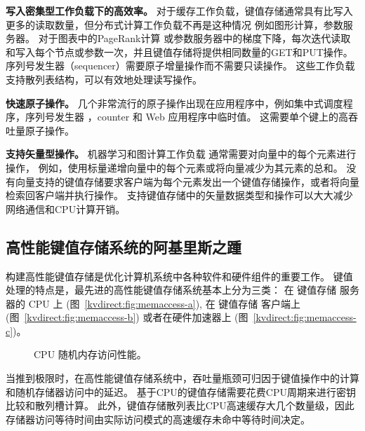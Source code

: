 \textbf {写入密集型工作负载下的高效率。}
对于缓存工作负载，键值存储通常具有比写入更多的读取数量\cite {atikoglu2012workload}，但分布式计算工作负载不再是这种情况
例如图形计算\cite {page1999pagerank}，参数服务器\cite {li2014scaling}。
对于图表中的PageRank计算\cite {page1999pagerank} 或参数服务器中的梯度下降\cite {li2014scaling}，每次迭代读取和写入每个节点或参数一次，并且键值存储将提供相同数量的GET和PUT操作。
序列号发生器（sequencer）\cite {kalia2016design}需要原子增量操作而不需要只读操作。
这些工作负载支持散列表结构，可以有效地处理读写操作。

\textbf {快速原子操作。}
几个非常流行的原子操作出现在应用程序中，例如集中式调度程序\cite {perry2014fastpass}，序列号发生器 \cite {kalia2016design,eris}，counter \cite {zhu2015packet}和 Web 应用程序中临时值\cite {atikoglu2012workload}。
这需要单个键上的高吞吐量原子操作。

\textbf {支持矢量型操作。}
机器学习和图计算工作负载\cite {li2014scaling,shao2013trinity,xiao17tux2} 通常需要对向量中的每个元素进行操作，
例如，使用标量递增向量中的每个元素或将向量减少为其元素的总和。
没有向量支持的键值存储要求客户端为每个元素发出一个键值存储操作，或者将向量检索回客户端并执行操作。
支持键值存储中的矢量数据类型和操作可以大大减少网络通信和CPU计算开销。

\subsection{高性能键值存储系统的阿基里斯之踵}
\label{kvdirect:sec:state-of-the-art-kvs}

构建高性能键值存储是优化计算机系统中各种软件和硬件组件的重要工作。
键值处理的特点是，最先进的高性能键值存储系统基本上分为三类：
在 键值存储 服务器的 CPU 上
(图~\ref{kvdirect:fig:memaccess-a}),
在 键值存储 客户端上
(图~\ref{kvdirect:fig:memaccess-b})
或者在硬件加速器上
(图~\ref{kvdirect:fig:memaccess-c})。


\begin{figure}[t]
	\centering
	\caption{CPU 随机内存访问性能。}
	\label{kvdirect:fig:cpu-mem}
\end{figure}

当推到极限时，在高性能键值存储系统中，吞吐量瓶颈可归因于键值操作中的计算和随机存储器访问中的延迟。
基于CPU的键值存储需要花费CPU周期来进行密钥比较和散列槽计算。
此外，键值存储散列表比CPU高速缓存大几个数量级，因此存储器访问等待时间由实际访问模式的高速缓存未命中等待时间决定。


